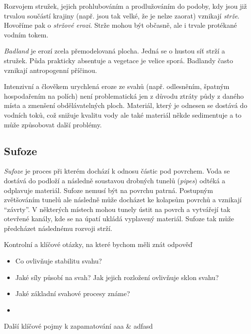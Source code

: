 Rozvojem stružek, jejich prohlubováním a prodlužováním do podoby, kdy jsou již trvalou součástí krajiny (např. jsou tak velké, že je nelze zaorat) vznikají \emph{strže}. Hovoříme pak o \emph{stržové erozi}. Strže mohou být občasně, ale i trvale protékané vodním tokem. 

\emph{Badland} je erozí zcela přemodelovaná plocha. Jedná se o hustou síť strží a stružek. Půda prakticky absentuje a vegetace je velice sporá. Badlandy často vznikají antropogenní příčinou. 

Intenzivní a člověkem urychlená eroze ze svahů (např. odlesněním, špatným hospodařením na polích) není problematická jen z důvodu ztráty půdy z daného místa a zmenšení obdělávatelných ploch. Materiál, který je odnesen se dostává do vodních toků, což snižuje kvalitu vody ale také materiál někde sedimentuje a to může způsobovat další problémy. 

\subsection{Sufoze}
\emph{Sufoze} je proces při kterém dochází k odnosu částic pod povrchem. Voda se dostává do podloží a následně soustavou drobných tunelů (\textit{pipes}) odtéká a odplavuje materiál. Sufoze nemusí být na povrchu patrná. Postupným zvětšováním tunelů ale následně může docházet ke kolapsům povrchů a vznikají \enquote{závrty}. V některých místech mohou tunely ústit na povrch a vytvářejí tak otevřené kanály, kde se na úpatí ukládá vyplavený materiál. Sufoze tak může předcházet následnému rozvoji strží. 

\newpage
\onecolumn
\begin{boxotazky}{Kontrolní a klíčové otázky, na které bychom měli znát odpověď}
	\begin{itemize}
		\item Co ovlivňuje stabilitu  svahu?
		\item Jaké síly působí na svah? Jak jejich rozložení ovlivňuje sklon svahu?
		\item Jaké základní svahové procesy známe?
		\item 
	\end{itemize}
\end{boxotazky}

\begin{boxslovnik}{Další klíčové pojmy k zapamatování}
	aaa & adfasd \\
	
\end{boxslovnik}
\twocolumn